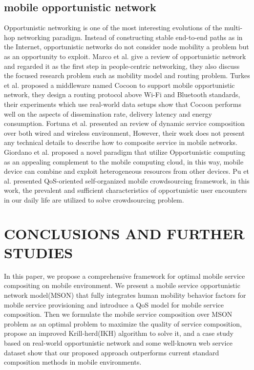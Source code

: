 \documentclass[10pt,journal,compsoc]{IEEEtran}
\begin{document}
\subsection{mobile opportunistic network}
Opportunistic networking is one of the most interesting evolutions of the multi-hop networking paradigm. Instead of constructing stable end-to-end paths as in the Internet, opportunistic networks do not consider node mobility a problem but as an opportunity to exploit. 
Marco et al. \cite{Conti2014} give a review of opportunistic network and regarded it as the first step in people-centric networking, they also discuss the focused research problem such as mobility model and routing problem.
Turkes et al. \cite{turkes2016cocoon} proposed a middleware named Cocoon to support mobile opportunistic network, they design a routing protocol above Wi-Fi and Bluetooth standards, their experiments which use real-world data setups show that Cocoon performs well on the aspects of dissemination rate, delivery latency and energy consumption.
Fortuna et al. \cite{fortuna2009dynamic} presented an review of dynamic service composition over both wired and wireless environment, However, their work does not present any technical details to describe how to composite service in mobile networks.
Giordano et al. \cite{Giordano2011} proposed a novel paradigm that utilize Opportunistic computing as an appealing complement to the mobile computing cloud, in this way, mobile device can combine and exploit heterogeneous resources from other devices.
Pu et al. \cite{Pu2017} presented QoS-oriented self-organized mobile crowdsourcing framework, in this work, the prevalent and sufficient characteristics of opportunistic user encounters in our daily life are utilized to solve crowdsourcing problem.
\section{CONCLUSIONS AND FURTHER STUDIES}
In this paper, we propose a comprehensive framework for optimal mobile service compositing on mobile environment. We present a mobile service opportunistic network model(MSON) that fully integrates human mobility behavior factors for mobile service provisioning and introduce a QoS model for mobile service composition. Then we formulate the mobile service composition over MSON problem as an optimal problem to maximize the quality of service composition, propose an improved Krill-herd(IKH) algorithm to solve it, and a case study based on real-world opportunistic network and some well-known web service dataset show that our proposed approach outperforms current standard composition methods in mobile environments.
\end{document}
